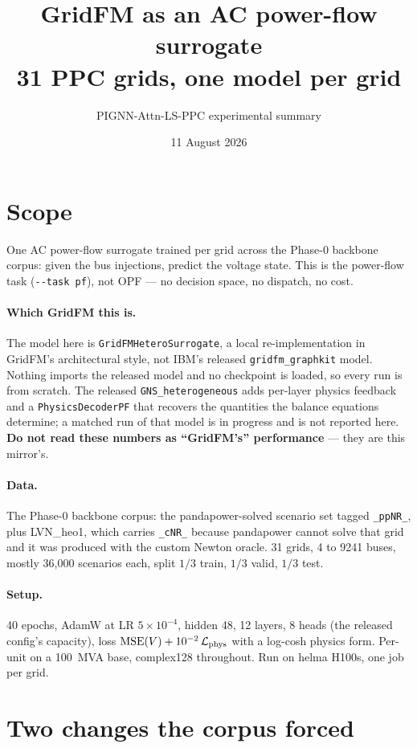 \documentclass[10pt]{article}
\title{GridFM as an AC power-flow surrogate\\
\large 31 PPC grids, one model per grid}
\author{PIGNN-Attn-LS-PPC experimental summary}
\date{11 August 2026}
\begin{document}
\maketitle

\section{Scope}

One AC power-flow surrogate trained per grid across the Phase-0 backbone corpus:
given the bus injections, predict the voltage state. This is the power-flow task
(\texttt{-{}-task pf}), not OPF --- no decision space, no dispatch, no cost.

\paragraph{Which GridFM this is.} The model here is
\texttt{GridFMHeteroSurrogate}, a local re-implementation in GridFM's
architectural style, not IBM's released \texttt{gridfm\_graphkit} model. Nothing
imports the released model and no checkpoint is loaded, so every run is from
scratch. The released \texttt{GNS\_heterogeneous} adds per-layer physics
feedback and a \texttt{PhysicsDecoderPF} that recovers the quantities the
balance equations determine; a matched run of that model is in progress and is
not reported here. \textbf{Do not read these numbers as ``GridFM's''
performance} --- they are this mirror's.

\paragraph{Data.} The Phase-0 backbone corpus: the pandapower-solved scenario
set tagged \texttt{\_ppNR\_}, plus LVN\_heo1, which carries \texttt{\_cNR\_}
because pandapower cannot solve that grid and it was produced with the custom
Newton oracle. 31 grids, 4 to 9241 buses, mostly 36{,}000 scenarios each, split
$1/3$ train, $1/3$ valid, $1/3$ test.

\paragraph{Setup.} 40 epochs, AdamW at LR $5\times10^{-4}$, hidden 48, 12
layers, 8 heads (the released config's capacity), loss
$\mathrm{MSE}(V) + 10^{-2}\,\mathcal{L}_{\rm phys}$ with a log-cosh physics
form. Per-unit on a 100~MVA base, complex128 throughout. Run on helma H100s,
one job per grid.

\section{Two changes the corpus forced}
\end{document}
